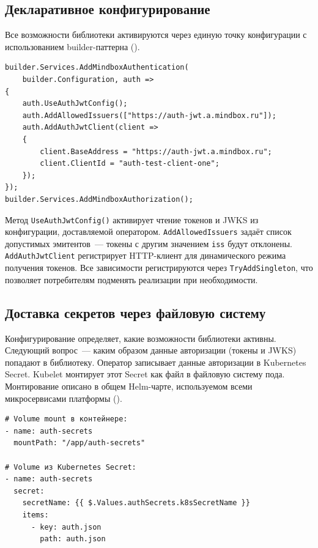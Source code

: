 \subsection{Декларативное конфигурирование}\label{subsec:declarative-config}

Все возможности библиотеки активируются
через единую точку конфигурации
с использованием builder-паттерна
().

\begin{lstlisting}[language={[Sharp]C}]
builder.Services.AddMindboxAuthentication(
    builder.Configuration, auth =>
{
    auth.UseAuthJwtConfig();
    auth.AddAllowedIssuers(["https://auth-jwt.a.mindbox.ru"]);
    auth.AddAuthJwtClient(client =>
    {
        client.BaseAddress = "https://auth-jwt.a.mindbox.ru";
        client.ClientId = "auth-test-client-one";
    });
});
builder.Services.AddMindboxAuthorization();
\end{lstlisting}

Метод \texttt{UseAuthJwtConfig()} активирует чтение токенов и JWKS
из конфигурации, доставляемой оператором.
\texttt{AddAllowedIssuers} задаёт список допустимых эмитентов~---
токены с другим значением \texttt{iss} будут отклонены.
\texttt{AddAuthJwtClient} регистрирует HTTP-клиент
для динамического режима получения токенов.
Все зависимости регистрируются через \texttt{TryAddSingleton},
что позволяет потребителям подменять реализации при необходимости.

\subsection{Доставка секретов через файловую систему}\label{subsec:file-delivery}

Конфигурирование определяет, какие возможности библиотеки активны.
Следующий вопрос~--- каким образом данные авторизации
(токены и JWKS) попадают в библиотеку.
Оператор записывает данные авторизации в Kubernetes Secret.
Kubelet монтирует этот Secret как файл в файловую систему пода.
Монтирование описано в общем Helm-чарте,
используемом всеми микросервисами платформы ().

\begin{lstlisting}[language=HCL]
# Volume mount в контейнере:
- name: auth-secrets
  mountPath: "/app/auth-secrets"

# Volume из Kubernetes Secret:
- name: auth-secrets
  secret:
    secretName: {{ $.Values.authSecrets.k8sSecretName }}
    items:
      - key: auth.json
        path: auth.json
\end{lstlisting}


